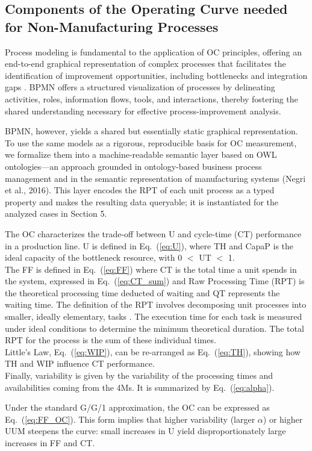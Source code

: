\documentclass[preprint,12pt,authoryear]{elsarticle}
\begin{document}
\subsection{Components of the Operating Curve needed for Non-Manufacturing Processes}\label{subsec:Components of the Operating Curve needed for Non-Manufacturing Processes}

Process modeling is fundamental to the application of OC principles, offering an end-to-end graphical representation of complex processes that facilitates the identification of improvement opportunities, including bottlenecks and integration gaps \citep{vanner2020bpmn}. BPMN offers a structured visualization of processes by delineating activities, roles, information flows, tools, and interactions, thereby fostering the shared understanding necessary for effective process-improvement analysis\citep{OMG2011}.

BPMN, however, yields a shared but essentially static graphical representation. To use the same models as a rigorous, reproducible basis for OC measurement, we formalize them into a machine-readable semantic layer based on OWL ontologies---an approach grounded in ontology-based business process management \citep{hepp2005semantic, thomas2009semantic} and in the semantic representation of manufacturing systems (Negri et al., 2016). This layer encodes the RPT of each unit process as a typed property and makes the resulting data queryable; it is instantiated for the analyzed cases in Section 5.

The OC characterizes the trade-off between U and cycle-time (CT) performance in a production line. U is defined in Eq.~(\ref{eq:U}), where TH and CapaP is the ideal capacity of the bottleneck resource, with 0 $<$ UT $<$ 1.\\ The FF is defined in Eq.~(\ref{eq:FF}) where CT is the total time a unit spends in the system, expressed in Eq.~(\ref{eq:CT_sum}) and Raw Processing Time (RPT) is the theoretical processing time deducted of waiting and QT represents the waiting time. The definition of the RPT involves decomposing unit processes into smaller, ideally elementary, tasks \citep{national1995unit}.
The execution time for each task is measured under ideal conditions to determine the minimum theoretical duration. The total RPT for the process is the sum of these individual times.\\
Little's Law, Eq.~(\ref{eq:WIP}), can be re-arranged as Eq.~(\ref{eq:TH}), showing how TH and WIP influence CT performance.\\
Finally, variability is given by the variability of the processing times and availabilities coming from the 4Ms\@. It is summarized by Eq.~(\ref{eq:alpha}).\par
Under the standard G/G/1 approximation, the OC can be expressed as Eq.~(\ref{eq:FF_OC})\@. This form implies that higher variability (larger $\alpha$) or higher UUM steepens the curve: small increases in U yield disproportionately large increases in FF and CT.
\end{document}
